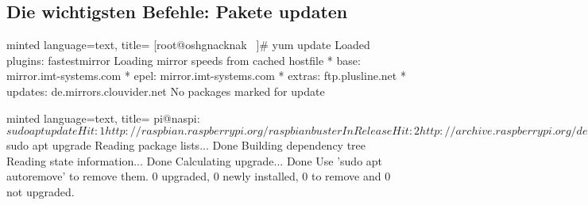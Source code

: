 \documentclass[
    ngerman,
    accentcolor=3b,
    dark_mode,
    fontsize= 12pt,
    a4paper,
    aspectratio=169,
    colorback=true,
    fancy_row_colors,
    leqno,
    fleqn,
    boxarc=3pt,
    fleqn,
]{algoslides}
\begin{document}
    \subsection{Die wichtigsten Befehle: Pakete updaten}
    \begin{frame}[fragile]
        \slidehead{}
        \begin{codeBlock}[fontsize=\tiny]{minted language=text, title=}
            [root@oshgnacknak ~]# yum update
            Loaded plugins: fastestmirror
            Loading mirror speeds from cached hostfile
             * base: mirror.imt-systems.com
             * epel: mirror.imt-systems.com
             * extras: ftp.plusline.net
             * updates: de.mirrors.clouvider.net
            No packages marked for update
        \end{codeBlock}
    \end{frame}
    \begin{frame}[fragile]
        \slidehead{}
        \begin{codeBlock}[fontsize=\tiny]{minted language=text, title=}
            pi@naspi:~ $ sudo apt update
            Hit:1 http://raspbian.raspberrypi.org/raspbian buster InRelease
            Hit:2 http://archive.raspberrypi.org/debian buster InRelease
            Get:3 https://download.docker.com/linux/raspbian buster InRelease [33.6 kB]
            Hit:4 https://deb.nodesource.com/node_14.x buster InRelease
            Fetched 33.6 kB in 1s (27.9 kB/s)
            Reading package lists... Done
            Building dependency tree
            Reading state information... Done
            All packages are up to date.
            pi@naspi:~ $ sudo apt upgrade
            Reading package lists... Done
            Building dependency tree
            Reading state information... Done
            Calculating upgrade... Done
            Use 'sudo apt autoremove' to remove them.
            0 upgraded, 0 newly installed, 0 to remove and 0 not upgraded.
        \end{codeBlock}
    \end{frame}
    \begin{frame}[fragile]
        \slidehead{}
    \end{frame}
\end{document}
